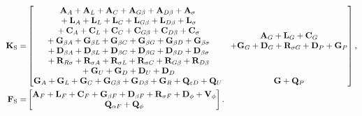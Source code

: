 \begin{align} \label{eq:GeneralStabilizationMatrices}
  \mathbf{K}_{\mathrm{S}} = &
  \begin{bmatrix}
    \begin{matrix}
      \mathbf{A}_A + \mathbf{A}_L + \mathbf{A}_C + \mathbf{A}_{G\beta} + \mathbf{A}_{D\beta} + \mathbf{A}_\sigma                                                             \\
      \vphantom{\mathbf{A}_A} + \mathbf{L}_A + \mathbf{L}_L + \mathbf{L}_C + \mathbf{L}_{G\beta} + \mathbf{L}_{D\beta} + \mathbf{L}_\sigma                                   \\
      \vphantom{\mathbf{A}_A} + \mathbf{C}_A + \mathbf{C}_L + \mathbf{C}_C + \mathbf{C}_{G\beta} + \mathbf{C}_{D\beta} + \mathbf{C}_\sigma                                   \\
      \vphantom{\mathbf{A}_A} + \mathbf{G}_{\beta A} + \mathbf{G}_{\beta L} + \mathbf{G}_{\beta C} + \mathbf{G}_{\beta G} + \mathbf{G}_{\beta D} + \mathbf{G}_{\beta \sigma} \\
      \vphantom{\mathbf{A}_A} + \mathbf{D}_{\beta A} + \mathbf{D}_{\beta L} + \mathbf{D}_{\beta C} + \mathbf{D}_{\beta G} + \mathbf{D}_{\beta D} + \mathbf{D}_{\beta \sigma} \\
      \vphantom{\mathbf{A}_A} + \mathbf{R}_{R\sigma} + \mathbf{R}_{\sigma A} + \mathbf{R}_{\sigma L} + \mathbf{R}_{\sigma C} + \mathbf{R}_{G\beta} + \mathbf{R}_{D\beta}     \\
      \vphantom{\mathbf{A}_A} + \mathbf{G}_U + \mathbf{G}_{D} + \mathbf{D}_{U} + \mathbf{D}_{D}
    \end{matrix} &
    \begin{matrix}
      \mathbf{A}_G + \mathbf{L}_G + \mathbf{C}_G \\
      + \mathbf{G}_G + \mathbf{D}_G + \mathbf{R}_{\sigma G} + \mathbf{D}_P + \mathbf{G}_P
    \end{matrix}                                                                                                                                 \\
    \mathbf{G}_A + \mathbf{G}_L + \mathbf{G}_C + \mathbf{G}_{G \beta} + \mathbf{G}_{D \beta} + \mathbf{G}_R  + \mathbf{Q}_{\varepsilon D} + \mathbf{Q}_U                                   & \mathbf{G} + \mathbf{Q}_P
  \end{bmatrix}, \\
  \mathbf{F}_{\mathrm{S}} = &
  \begin{bmatrix}
    \mathbf{A}_F + \mathbf{L}_F + \mathbf{C}_F + \mathbf{G}_{\beta F} + \mathbf{D}_{\beta F} + \mathbf{R}_{\sigma F} + \mathbf{D}_{\phi} + \mathbf{V}_{\phi} \\
    \mathbf{Q}_{\alpha F} + \mathbf{Q}_{\phi}
  \end{bmatrix}.
\end{align}
